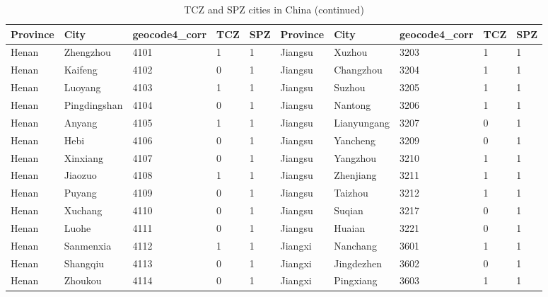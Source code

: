 \begin{table}[!htbp] \centering
  \caption{TCZ and SPZ cities in China (continued)}
  \begin{adjustbox}{width=\textwidth, totalheight=\baselineskip,keepaspectratio}
    \label{tab:appendix2}
\begin{tabular}{llllllllll}
\hline
Province       & City         & geocode4\_corr & TCZ & SPZ & Province & City        & geocode4\_corr & TCZ & SPZ \\
\hline
Henan          & Zhengzhou    & 4101           & 1   & 1   & Jiangsu  & Xuzhou      & 3203           & 1   & 1   \\
Henan          & Kaifeng      & 4102           & 0   & 1   & Jiangsu  & Changzhou   & 3204           & 1   & 1   \\
Henan          & Luoyang      & 4103           & 1   & 1   & Jiangsu  & Suzhou      & 3205           & 1   & 1   \\
Henan          & Pingdingshan & 4104           & 0   & 1   & Jiangsu  & Nantong     & 3206           & 1   & 1   \\
Henan          & Anyang       & 4105           & 1   & 1   & Jiangsu  & Lianyungang & 3207           & 0   & 1   \\
Henan          & Hebi         & 4106           & 0   & 1   & Jiangsu  & Yancheng    & 3209           & 0   & 1   \\
Henan          & Xinxiang     & 4107           & 0   & 1   & Jiangsu  & Yangzhou    & 3210           & 1   & 1   \\
Henan          & Jiaozuo      & 4108           & 1   & 1   & Jiangsu  & Zhenjiang   & 3211           & 1   & 1   \\
Henan          & Puyang       & 4109           & 0   & 1   & Jiangsu  & Taizhou     & 3212           & 1   & 1   \\
Henan          & Xuchang      & 4110           & 0   & 1   & Jiangsu  & Suqian      & 3217           & 0   & 1   \\
Henan          & Luohe        & 4111           & 0   & 1   & Jiangsu  & Huaian      & 3221           & 0   & 1   \\
Henan          & Sanmenxia    & 4112           & 1   & 1   & Jiangxi  & Nanchang    & 3601           & 1   & 1   \\
Henan          & Shangqiu     & 4113           & 0   & 1   & Jiangxi  & Jingdezhen  & 3602           & 0   & 1   \\
Henan          & Zhoukou      & 4114           & 0   & 1   & Jiangxi  & Pingxiang   & 3603           & 1   & 1   \\

\end{tabular}
\end{adjustbox}
\end{table}
